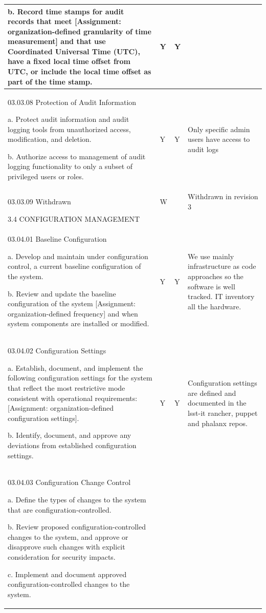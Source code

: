 \begin{longtable} {|p{}|p{}|p{}|p{} |}
{b. Record time stamps for audit records that meet [Assignment: organization-defined granularity of time measurement] and that use Coordinated Universal Time (UTC), have a fixed local time offset from UTC, or include the local time offset as part of the time stamp.}&{Y}&{Y}& \\ \hline
{03.03.08 Protection of Audit Information

a. Protect audit information and audit logging tools from unauthorized access, modification, and deletion.

b. Authorize access to management of audit logging functionality to only a subset of privileged users or roles.}&{Y}&{Y}&{Only specific admin users have access to audit logs} \\ \hline
{03.03.09 Withdrawn}&{W}&{}&{Withdrawn in revision 3} \\ \hline
{3.4 CONFIGURATION MANAGEMENT}&&& \\ \hline
{03.04.01 Baseline Configuration

a. Develop and maintain under configuration control, a current baseline configuration of the system.

b. Review and update the baseline configuration of the system [Assignment: organization-defined frequency] and when system components are installed or modified.}&{Y}&{Y}&{We use mainly infrastructure as code approaches so the software is well tracked. IT inventory all the hardware. } \\ \hline
{03.04.02 Configuration Settings

a. Establish, document, and implement the following configuration settings for the system that reflect the most restrictive mode consistent with operational requirements: [Assignment: organization-defined configuration settings].

b. Identify, document, and approve any deviations from established configuration settings.}&{Y}&{Y}&{Configuration settings are defined and documented in the lsst-it rancher, puppet  and phalanx repos. } \\ \hline
{03.04.03 Configuration Change Control

a. Define the types of changes to the system that are configuration-controlled.

b. Review proposed configuration-controlled changes to the system, and approve
or disapprove such changes with explicit consideration for security impacts.

c. Implement and document approved configuration-controlled changes to the
system.

}
\end{longtable}
